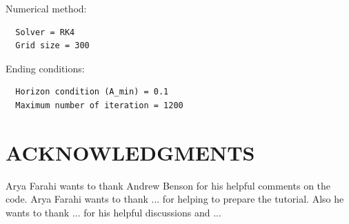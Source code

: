 \documentclass[12pt]{article}
\begin{document}
Numerical method:
\begin{verbatim}
  Solver = RK4
  Grid size = 300
\end{verbatim}

Ending conditions:
\begin{verbatim}
  Horizon condition (A_min) = 0.1
  Maximum number of iteration = 1200
\end{verbatim}


\section*{ACKNOWLEDGMENTS}
 Arya Farahi wants to thank Andrew Benson for his helpful comments on the code. Arya Farahi wants to thank ... for helping to prepare the tutorial. Also he wants to thank ... for his helpful discussions and ...
 
\end{document}
